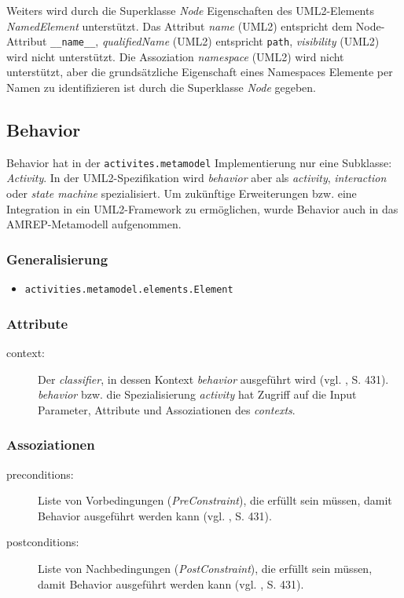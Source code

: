 Weiters wird durch die Superklasse \emph{Node} Eigenschaften des UML2-Elements \emph{NamedElement} unterstützt. Das Attribut \emph{name} (UML2) entspricht dem Node-Attribut \texttt{\_\_name\_\_}, \emph{qualifiedName} (UML2) entspricht \texttt{path}, \emph{visibility} (UML2) wird nicht unterstützt. Die Assoziation \emph{namespace} (UML2) wird nicht unterstützt, aber die grundsätzliche Eigenschaft eines Namespaces Elemente per Namen zu identifizieren ist durch die Superklasse \emph{Node} gegeben.


\subsection{Behavior}
Behavior hat in der \texttt{activites.metamodel} Implementierung nur eine Subklasse: \emph{Activity}. In der UML2-Spezifikation wird \emph{behavior} aber als \emph{activity}, \emph{interaction} oder \emph{state machine} spezialisiert. Um zukünftige Erweiterungen bzw. eine Integration in ein UML2-Framework zu ermöglichen, wurde Behavior auch in das AMREP-Metamodell aufgenommen.

\subsubsection{Generalisierung}
\begin{itemize}
\item \texttt{activities.metamodel.elements.Element}
\end{itemize}

\subsubsection{Attribute}
\begin{description}
\item[context:] Der \emph{classifier}, in dessen Kontext \emph{behavior} ausgeführt wird (vgl. \citep{OMG2009}, S. 431). \emph{behavior} bzw. die Spezialisierung \emph{activity} hat Zugriff auf die Input Parameter, Attribute und Assoziationen des \emph{contexts}.
\end{description}

\subsubsection{Assoziationen}
\begin{description}
\item[preconditions:] Liste von Vorbedingungen (\emph{PreConstraint}), die erfüllt sein müssen, damit Behavior ausgeführt werden kann (vgl. \citep{OMG2009}, S. 431).
\item[postconditions:] Liste von Nachbedingungen (\emph{PostConstraint}), die erfüllt sein müssen, damit Behavior ausgeführt werden kann (vgl. \citep{OMG2009}, S. 431).
\end{description}

